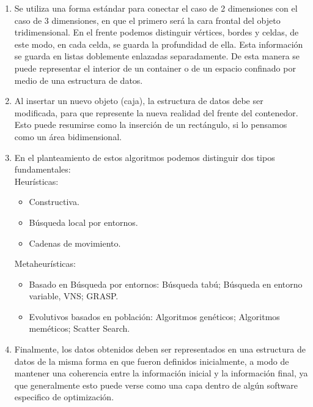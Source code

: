 \begin{enumerate}
\item Se utiliza una forma estándar para conectar el caso de 2 dimensiones con el caso
      de 3 dimensiones, en que el primero será la cara frontal del objeto tridimensional.
      En el frente podemos distinguir vértices, bordes y celdas, de este modo, en cada
      celda, se guarda la profundidad de ella. Esta información se guarda en listas doblemente
      enlazadas separadamente. De esta manera se puede representar el interior de un container
      o de un espacio confinado por medio de una estructura de datos.
\item Al insertar un nuevo objeto (caja), la estructura de datos debe ser modificada, para
      que represente la nueva realidad del frente del contenedor. Esto puede resumirse como
      la inserción de un rectángulo, si lo pensamos como un área bidimensional.
\item En el planteamiento de estos algoritmos podemos distinguir dos tipos fundamentales: \\
Heurísticas:
\begin{itemize}
 \item Constructiva.
 \item Búsqueda local por entornos.
 \item Cadenas de movimiento.
\end{itemize}
Metaheurísticas:
\begin{itemize}
 \item Basado en Búsqueda por entornos: Búsqueda tabú; Búsqueda en entorno variable, VNS; GRASP.
 \item Evolutivos basados en población: Algoritmos genéticos; Algoritmos meméticos; Scatter Search.
\end{itemize}
\item Finalmente, los datos obtenidos deben ser representados en una estructura de datos de
      la misma forma en que fueron definidos inicialmente, a modo de mantener una coherencia
      entre la información inicial y la información final, ya que generalmente esto puede
      verse como una capa dentro de algún software especifico de optimización.
\end{enumerate}
